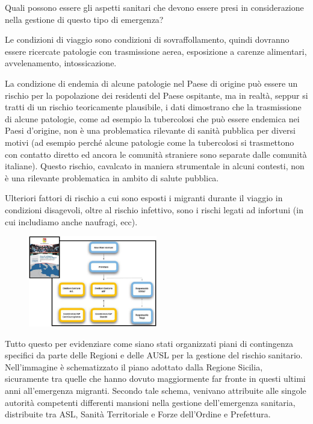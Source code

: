 Quali possono essere gli aspetti sanitari che devono essere presi in
considerazione nella gestione di questo tipo di emergenza?

Le condizioni di viaggio sono condizioni di sovraffollamento, quindi
dovranno essere ricercate patologie con trasmissione aerea, esposizione
a carenze alimentari, avvelenamento, intossicazione.

La condizione di endemia di alcune patologie nel Paese di origine può
essere un rischio per la popolazione dei residenti del Paese ospitante,
ma in realtà, seppur si tratti di un rischio teoricamente plausibile, i
dati dimostrano che la trasmissione di alcune patologie, come ad esempio
la tubercolosi che può essere endemica nei Paesi d'origine, non è una
problematica rilevante di sanità pubblica per diversi motivi (ad esempio
perché alcune patologie come la tubercolosi si trasmettono con contatto
diretto ed ancora le comunità straniere sono separate dalle comunità
italiane). Questo rischio, cavalcato in maniera strumentale in alcuni
contesti, non è una rilevante problematica in ambito di salute pubblica.

Ulteriori fattori di rischio a cui sono esposti i migranti durante il
viaggio in condizioni disagevoli, oltre al rischio infettivo, sono i
rischi legati ad infortuni (in cui includiamo anche naufragi, ecc).

\begin{figure}[!ht]
\centering
	\includegraphics[width=0.5\textwidth]{26/image16.jpeg}
	\end{figure}
	
Tutto questo per evidenziare come siano stati organizzati piani di
contingenza specifici da parte delle Regioni e delle AUSL per la
gestione del rischio sanitario. Nell'immagine è schematizzato il piano
adottato dalla Regione Sicilia, sicuramente tra quelle che hanno dovuto
maggiormente far fronte in questi ultimi anni all'emergenza migranti.
Secondo tale schema, venivano attribuite alle singole autorità
competenti differenti mansioni nella gestione dell'emergenza sanitaria,
distribuite tra ASL, Sanità Territoriale e Forze dell'Ordine e
Prefettura.

